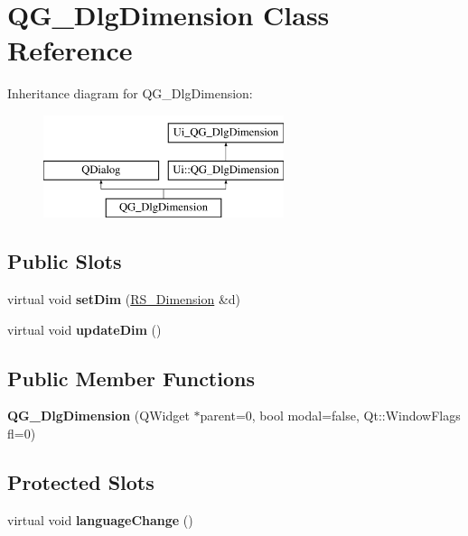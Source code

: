 \hypertarget{classQG__DlgDimension}{\section{Q\-G\-\_\-\-Dlg\-Dimension Class Reference}
\label{classQG__DlgDimension}
}
Inheritance diagram for Q\-G\-\_\-\-Dlg\-Dimension\-:\begin{figure}[H]
\begin{center}
\leavevmode
\includegraphics[height=3.000000cm]{classQG__DlgDimension}
\end{center}
\end{figure}
\subsection*{Public Slots}
\begin{DoxyCompactItemize}
\item 
\hypertarget{classQG__DlgDimension_ae9b45bcfb9cdc188f84d100dde776171}{virtual void {\bfseries set\-Dim} (\hyperlink{classRS__Dimension}{R\-S\-\_\-\-Dimension} \&d)}\label{classQG__DlgDimension_ae9b45bcfb9cdc188f84d100dde776171}

\item 
\hypertarget{classQG__DlgDimension_ab462ca15d4427b947cf3631e629cfe6f}{virtual void {\bfseries update\-Dim} ()}\label{classQG__DlgDimension_ab462ca15d4427b947cf3631e629cfe6f}

\end{DoxyCompactItemize}
\subsection*{Public Member Functions}
\begin{DoxyCompactItemize}
\item 
\hypertarget{classQG__DlgDimension_aa1a0e77d1e99ff39afdad37784016a20}{{\bfseries Q\-G\-\_\-\-Dlg\-Dimension} (Q\-Widget $\ast$parent=0, bool modal=false, Qt\-::\-Window\-Flags fl=0)}\label{classQG__DlgDimension_aa1a0e77d1e99ff39afdad37784016a20}

\end{DoxyCompactItemize}
\subsection*{Protected Slots}
\begin{DoxyCompactItemize}
\item 
\hypertarget{classQG__DlgDimension_ab4ce05f6a5ec08b183ea6d12c47ccee3}{virtual void {\bfseries language\-Change} ()}\label{classQG__DlgDimension_ab4ce05f6a5ec08b183ea6d12c47ccee3}

\end{DoxyCompactItemize}
